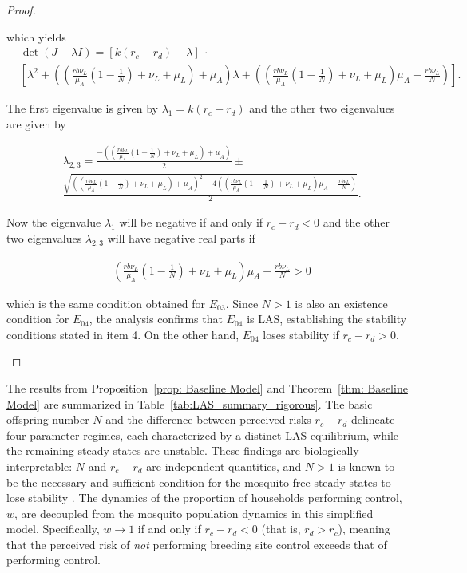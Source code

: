 \documentclass{article}
\theoremstyle{remark}
\theoremstyle{custom} %
\begin{document}
\begin{proof}
\begin{itemize}
which yields 
$$
\begin{aligned}
& \operatorname{det}(J-\lambda I) =[k(r_c - r_d)-\lambda]  \ \cdot \  \\ 
& {\left[\lambda^2+\left(\left(\frac{r b \nu_L}{\mu_A}\left(1-\frac{1}{{N}}\right)+\nu_L+\mu_L\right)+\mu_A\right) \lambda+\left(\left(\frac{r b \nu_L}{\mu_A}\left(1-\frac{1}{{N}}\right)+\nu_L+\mu_L\right) \mu_A-\frac{r b \nu_L}{{N}}\right)\right]}.
\end{aligned}
$$

The first eigenvalue is given by \(\lambda_1 = k(r_c - r_d)\) and the other two eigenvalues are given by 

$$\begin{aligned}
& \lambda_{2,3}=\frac{-\left(\left(\frac{r b \nu_L}{\mu_A}\left(1-\frac{1}{{N}}\right)+\nu_L+\mu_L\right)+\mu_A\right)}{2} \pm \\
& \frac{\sqrt{\left(\left(\frac{r b \nu_L}{\mu_A}\left(1-\frac{1}{{N}}\right)+\nu_L+\mu_L\right)+\mu_A\right)^2-4\left(\left(\frac{r b \nu_L}{\mu_A}\left(1-\frac{1}{{N}}\right)+\nu_L+\mu_L\right) \mu_A-\frac{r b \nu_L}{{N}}\right)}}{2}.
\end{aligned}
$$

Now the eigenvalue \(\lambda_1\) will be negative if and only if $r_c - r_d<0$ and the other two eigenvalues \(\lambda_{2,3}\) will have negative real parts if

$$
\begin{aligned}
& \left(\frac{r b \nu_L}{\mu_A}\left(1-\frac{1}{{N}}\right)+\nu_L+\mu_L\right) \mu_A-\frac{r b \nu_L}{{N}}>0
\end{aligned}
$$

which is the same condition obtained for $E_{03}$. Since $N>1$ is also an existence condition for $E_{04}$, the analysis confirms that $E_{04}$ is LAS, establishing the stability conditions stated in item 4. On the other hand, $E_{04}$ loses stability if $r_c-r_d >0$.


\end{itemize}

\end{proof}

 The results from Proposition~\ref{prop: Baseline Model} and Theorem~\ref{thm: Baseline Model} are summarized in Table~\ref{tab:LAS_summary_rigorous}. The basic offspring number $N$ and the difference between perceived risks $r_c - r_d$ delineate four parameter regimes, each characterized by a distinct LAS equilibrium, while the remaining steady states are unstable. These findings are biologically interpretable: $N$ and $r_c - r_d$ are independent quantities, and $N > 1$ is known to be the necessary and sufficient condition for the mosquito-free steady states to lose stability \cite{dumont_mosquito_control}. The dynamics of the proportion of households performing control, $w$, are decoupled from the mosquito population dynamics in this simplified model. Specifically, $w \to 1$ if and only if $r_c - r_d < 0$ (that is, $r_d > r_c$), meaning that the perceived risk of \emph{not} performing breeding site control exceeds that of performing control.
\end{document}
